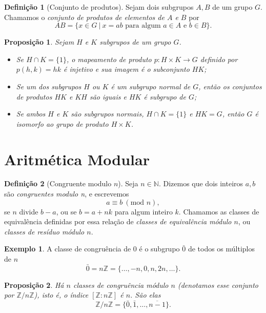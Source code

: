 \documentclass[a4paper,12pt]{report}
\theoremstyle{plain}
\newtheorem{proposicao}{Proposição}[section]
\theoremstyle{definition}
\newtheorem{definicao}{Definição}[section]
\newtheorem{exemplo}{Exemplo}[section]
\begin{document}
\begin{definicao}[Conjunto de produtos]
	Sejam dois subgrupos \(A,B\) de um grupo \(G\).
	Chamamos o \emph{conjunto de produtos de elementos de \(A\) e \(B\)} por
	\[AB = \{x\in G \ | \ x = ab \text{ para algum }a\in A\text{ e }b\in B\}.\]
\end{definicao}

\begin{proposicao}
	Sejam \(H\) e \(K\) subgrupos de um grupo \(G\).
	\begin{itemize}
		\item Se \(H\cap K = \{1\}\), o mapeamento de produto
		\(p: H\times K\longrightarrow G\) definido por \(p(h,k) = hk\) é
		injetivo e sua imagem é o subconjunto \(HK\);
		\item Se um dos subgrupos
		\(H\) ou \(K\) é um subgrupo normal de \(G\), então os conjuntos de
		produtos \(HK\) e \(KH\) são iguais e \(HK\) é subgrupo de \(G\);
		\item Se ambos \(H\) e \(K\) são subgrupos normais, \(H\cap K = \{1\}\) e
		\(HK = G\), então \(G\) é isomorfo ao grupo de produto \(H\times K\).
	\end{itemize}
\end{proposicao}

\section{Aritmética Modular}

\begin{definicao}[Congruente modulo $n$]
	Seja \(n\in\mathbb{N}\). Dizemos que dois inteiros
	\(a,b\) são \emph{congruentes modulo n}, e escrevemos
	\[ a \equiv b \ (\text{mod }n),\]
	se \(n\) divide \(b-a\), ou se \(b = a + nk\) para algum inteiro \(k\).
	Chamamos as classes de equivalência definidas por essa relação de
	\emph{classes de equivalência módulo \(n\)}, ou \emph{classes de resíduo módulo \(n\)}.	
\end{definicao}

\begin{exemplo}
	A classe de congruência de 0 é o subgrupo \(\bar{0}\)
	de todos os múltiplos de \(n\) \[\bar{0} = n\mathbb{Z} = \{\dots,-n,0,n,2n, \dots\}.\]
\end{exemplo}

\begin{proposicao}
	Há \(n\) classes de congruência módulo \(n\) (denotamos esse conjunto por \(\mathbb{Z}/n\mathbb{Z}\)), isto é, o índice \([\mathbb{Z}:n\mathbb{Z}]\) é \(n\). São elas \[\mathbb{Z}/n\mathbb{Z} =  \{\bar{0}, \bar{1},\dots,\overline{n - 1}\}.\]		
\end{proposicao}
\end{document}
